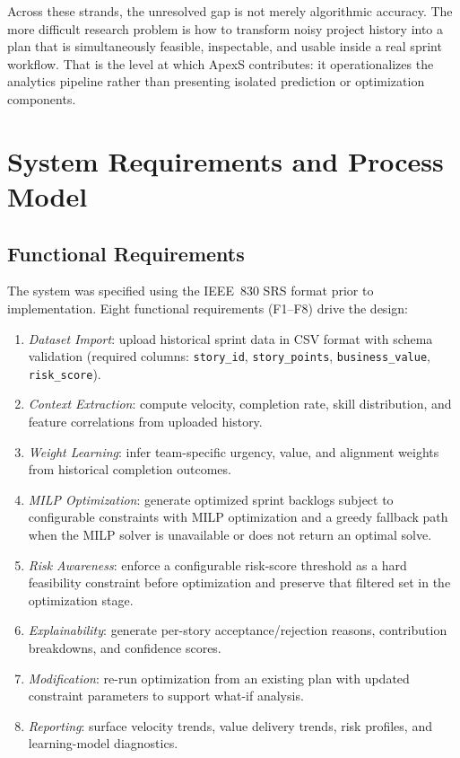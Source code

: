 \documentclass[conference]{IEEEtran}
\begin{document}
Across these strands, the unresolved gap is not merely algorithmic accuracy.
The more difficult research problem is how to transform noisy project history into a
plan that is simultaneously feasible, inspectable, and usable inside a real sprint
workflow.
That is the level at which ApexS contributes: it operationalizes the analytics
pipeline rather than presenting isolated prediction or optimization components.

\section{System Requirements and Process Model}
\label{sec:requirements}

\subsection{Functional Requirements}

The system was specified using the IEEE~830 SRS format prior to implementation.
Eight functional requirements (F1--F8) drive the design:

\begin{enumerate}[leftmargin=*,itemsep=1pt,topsep=2pt,label={F\arabic*.}]
\item \emph{Dataset Import}: upload historical sprint data in CSV format with
      schema validation (required columns: \texttt{story\_id},
      \texttt{story\_points}, \texttt{business\_value}, \texttt{risk\_score}).
\item \emph{Context Extraction}: compute velocity, completion rate, skill
      distribution, and feature correlations from uploaded history.
\item \emph{Weight Learning}: infer team-specific urgency, value, and alignment
      weights from historical completion outcomes.
\item \emph{MILP Optimization}: generate optimized sprint backlogs subject to
      configurable constraints with MILP optimization and a greedy fallback path
      when the MILP solver is unavailable or does not return an optimal solve.
\item \emph{Risk Awareness}: enforce a configurable risk-score threshold as a hard
      feasibility constraint before optimization and preserve that filtered set in
      the optimization stage.
\item \emph{Explainability}: generate per-story acceptance/rejection reasons,
      contribution breakdowns, and confidence scores.
\item \emph{Modification}: re-run optimization from an existing plan with updated
      constraint parameters to support what-if analysis.
\item \emph{Reporting}: surface velocity trends, value delivery trends, risk
      profiles, and learning-model diagnostics.
\end{enumerate}
\end{document}
